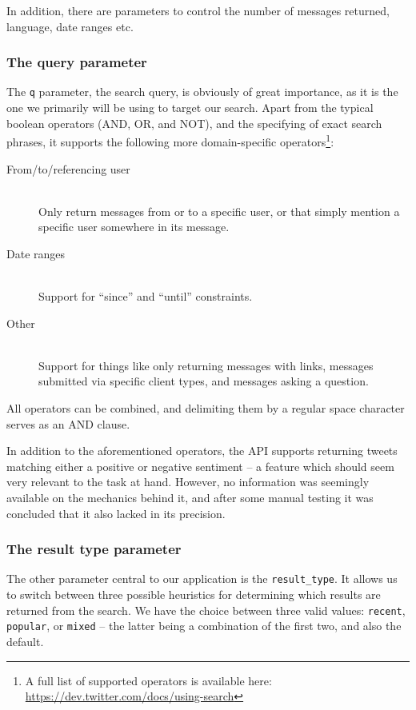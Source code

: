 In addition, there are parameters to control the number of messages returned, language, date ranges etc.

\subsubsection{The query parameter}

The \texttt{q} parameter, the search query, is obviously of great importance, as it is the one we primarily will be using to target our search. Apart from the typical boolean operators (AND, OR, and NOT), and the specifying of exact search phrases, it supports the following more domain-specific operators\footnote{A full list of supported operators is available here: \url{https://dev.twitter.com/docs/using-search}}:

\begin{description}
  \item[From/to/referencing user] \hfill \\
    Only return messages from or to a specific user, or that simply mention a specific user somewhere in its message.
  \item[Date ranges] \hfill \\
    Support for ``since'' and ``until'' constraints.
  \item[Other] \hfill \\
    Support for things like only returning messages with links, messages submitted via specific client types, and messages asking a question.
\end{description}

All operators can be combined, and delimiting them by a regular space character serves as an AND clause.

In addition to the aforementioned operators, the API supports returning tweets matching either a positive or negative sentiment -- a feature which should seem very relevant to the task at hand. However, no information was seemingly available on the mechanics behind it, and after some manual testing it was concluded that it also lacked in its precision.

\subsubsection{The result type parameter}

The other parameter central to our application is the \texttt{result\_type}. It allows us to switch between three possible heuristics for determining which results are returned from the search. We have the choice between three valid values: \texttt{recent}, \texttt{popular}, or \texttt{mixed} -- the latter being a combination of the first two, and also the default.

